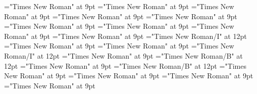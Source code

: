 \documentclass[gps1,twoside]{article}
\begin{document}
\font\spantranslationtranslationtranslationsexampleexamplessensesensessensesensessubentrysubentriesentrylastchildafter="Times New Roman" at 9pt
\font\spanspanencyclopedicinfosensesensessensesensessubentrysubentriesentrybefore="Times New Roman" at 9pt
\font\spanencyclopedicinfosensesensessensesensessubentrysubentriesentryfirstchildbefore="Times New Roman" at 9pt
\font\spanencyclopedicinfosensesensessensesensessubentrysubentriesentrylastchildafter="Times New Roman" at 9pt
\font\spanspanrestrictionssensesensessensesensessubentrysubentriesentrybefore="Times New Roman" at 9pt
\font\spanrestrictionssensesensessensesensessubentrysubentriesentryfirstchildbefore="Times New Roman" at 9pt
\font\spanrestrictionssensesensessensesensessubentrysubentriesentrylastchildafter="Times New Roman" at 9pt
\font\spanspanlexsensereferencessensesensessensesensessubentrysubentriesentrybefore="Times New Roman" at 9pt
\font\lexsensereferencessensesensessensesensessubentrysubentriesentryafter="Times New Roman" at 9pt
\font\spanenownertypeabbreviationlexsensereferencelexsensereferencessensesensessensesensessubentrysubentriesentry="Times New Roman/I" at 12pt
\font\spanspanownertypeabbreviationlexsensereferencelexsensereferencessensesensessensesensessubentrysubentriesentrybefore="Times New Roman" at 9pt
\font\spanownertypeabbreviationlexsensereferencelexsensereferencessensesensessensesensessubentrysubentriesentrylastchildafter="Times New Roman" at 9pt
\font\spanownertypeabbreviationlexsensereferencelexsensereferencessensesensessensesensessubentrysubentriesentry="Times New Roman/I" at 12pt
\font\configtargetconfigtargetconfigtargetslexsensereferencelexsensereferencessensesensessensesensessubentrysubentriesentrybefore="Times New Roman" at 9pt
\font\spanbzhheadwordconfigtargetconfigtargetslexsensereferencelexsensereferencessensesensessensesensessubentrysubentriesentry="Times New Roman/B" at 12pt
\font\spanspanheadwordconfigtargetconfigtargetslexsensereferencelexsensereferencessensesensessensesensessubentrysubentriesentrybefore="Times New Roman" at 9pt
\font\spanheadwordconfigtargetconfigtargetslexsensereferencelexsensereferencessensesensessensesensessubentrysubentriesentry="Times New Roman/B" at 12pt
\font\variantformentrybackrefvariantformentrybackrefvariantformentrybackrefssensesensessensesensessubentrysubentriesentrybefore="Times New Roman" at 9pt
\font\variantformentrybackrefssensesensessensesensessubentrysubentriesentrybefore="Times New Roman" at 9pt
\font\variantformentrybackrefssensesensessensesensessubentrysubentriesentryafter="Times New Roman" at 9pt
\font\variantentrytypevariantentrytypevariantentrytypesvariantformentrybackrefvariantformentrybackrefssensesensessensesensessubentrysubentriesentrybefore="Times New Roman" at 9pt
\end{document}
